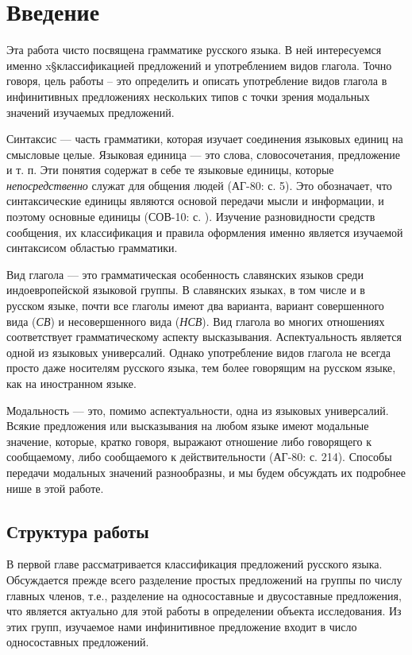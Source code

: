 \section{Введение}

Эта работа чисто посвящена грамматике русского языка. В ней интересуемся именно x§классификацией предложений и употреблением видов глагола. Точно говоря, цель работы -- это определить и описать употребление видов глагола в инфинитивных предложениях нескольких типов с точки зрения модальных значений изучаемых предложений.

Синтаксис --- часть грамматики, которая изучает соединения языковых единиц на смысловые целые. Языковая единица --- это слова, словосочетания, предложение и т. п. Эти понятия содержат в себе те языковые единицы, которые \textit{непосредственно} служат для общения людей (АГ-80: с. 5). Это обозначает, что синтаксические единицы являются основой передачи мысли и информации, и поэтому основные единицы (СОВ-10: с. ). Изучение разновидности средств сообщения, их классификация и правила оформления именно является изучаемой синтаксисом областью грамматики.

Вид глагола --- это грамматическая особенность славянских языков среди индоевропейской языковой группы. В славянских языках, в том числе и в русском языке, почти все глаголы имеют два варианта, вариант совершенного вида (\textit{СВ}) и несовершенного вида (\textit{НСВ}). Вид глагола во многих отношениях соответствует грамматическому аспекту высказывания. Аспектуальность является одной из языковых универсалий. Однако употребление видов глагола не всегда просто даже носителям русского языка, тем более говорящим на русском языке, как на иностранном языке.

Модальность --- это, помимо аспектуальности, одна из языковых универсалий. Всякие предложения или высказывания на любом языке имеют модальные значение, которые, кратко говоря, выражают отношение либо говорящего к сообщаемому, либо сообщаемого к действительности (АГ-80: с. 214). Способы передачи модальных значений разнообразны, и мы будем обсуждать их подробнее нише в этой работе.

\subsection{Структура работы}

В первой главе рассматривается классификация предложений русского языка. Обсуждается прежде всего разделение простых предложений на группы по числу главных членов, т.е., разделение на односоставные и двусоставные предложения, что является актуально для этой работы в определении объекта исследования. Из этих групп, изучаемое нами инфинитивное предложение входит в число односоставных предложений.

